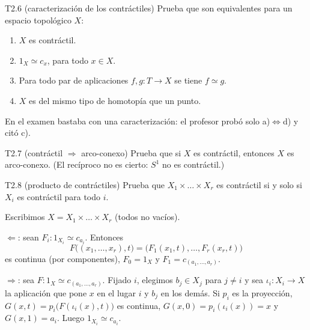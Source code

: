 \begin{ejercicio}{T2.6 (caracterización de los contráctiles)}
Prueba que son equivalentes para un espacio topológico $X$:
\begin{enumerate}
    \item[a)] $X$ es contráctil.
    \item[b)] $1_X \simeq c_x$, para todo $x \in X$.
    \item[c)] Para todo par de aplicaciones $f, g \colon T \to X$ se tiene $f \simeq g$.
    \item[d)] $X$ es del mismo tipo de homotopía que un punto.
\end{enumerate}

 \quad {}

En el examen bastaba con una caracterización: el profesor probó solo a)$\Leftrightarrow$d) y citó c).
\end{ejercicio}

\begin{ejercicio}{T2.7 (contráctil $\Rightarrow$ arco-conexo)}
Prueba que si $X$ es contráctil, entonces $X$ es arco-conexo. (El recíproco no es cierto: $S^1$ no es contráctil.)

 \quad {}
\end{ejercicio}

\begin{ejercicio}{T2.8 (producto de contráctiles)}
Prueba que $X_1 \times \dots \times X_r$ es contráctil si y solo si $X_i$ es contráctil para todo $i$.

\sol \fuentepropia

Escribimos $X = X_1 \times \dots \times X_r$ (todos no vacíos).

$\Leftarrow$: sean $F_i \colon 1_{X_i} \simeq c_{a_i}$. Entonces
\[ F\big((x_1,\dots,x_r),t\big) = \big(F_1(x_1,t),\dots,F_r(x_r,t)\big) \]
es continua (por componentes), $F_0 = 1_X$ y $F_1 = c_{(a_1,\dots,a_r)}$.

$\Rightarrow$: sea $F \colon 1_X \simeq c_{(a_1,\dots,a_r)}$. Fijado $i$, elegimos $b_j \in X_j$ para $j \neq i$ y sea $\iota_i \colon X_i \to X$ la aplicación que pone $x$ en el lugar $i$ y $b_j$ en los demás. Si $p_i$ es la proyección, $G(x,t) = p_i\big(F(\iota_i(x),t)\big)$ es continua, $G(x,0) = p_i(\iota_i(x)) = x$ y $G(x,1) = a_i$. Luego $1_{X_i} \simeq c_{a_i}$.
\end{ejercicio}

